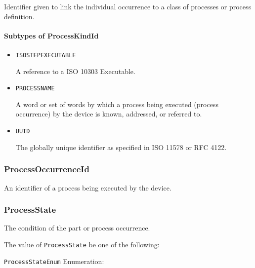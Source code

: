 Identifier given to link the individual occurrence to a class of processes or process definition.



\paragraph{Subtypes of ProcessKindId}\mbox{}
\label{sec:Subtypes of ProcessKindId}

\begin{itemize}

\item \texttt{ISO\textunderscore STEP\textunderscore EXECUTABLE}


A reference to a ISO 10303 Executable.

\item \texttt{PROCESS\textunderscore NAME}


A word or set of words by which a process being executed (process occurrence) by the device is known, addressed, or referred to.


\item \texttt{UUID}


The globally unique identifier as specified in ISO 11578 or RFC 4122.


\end{itemize}






\subsubsection{ProcessOccurrenceId}
\label{sec:ProcessOccurrenceId}



An identifier of a process being executed by the device.



\subsubsection{ProcessState}
\label{sec:ProcessState}



The condition of the part or process occurrence.


The value of \texttt{ProcessState} \MUST be one of the following: 


\texttt{ProcessStateEnum} Enumeration:

